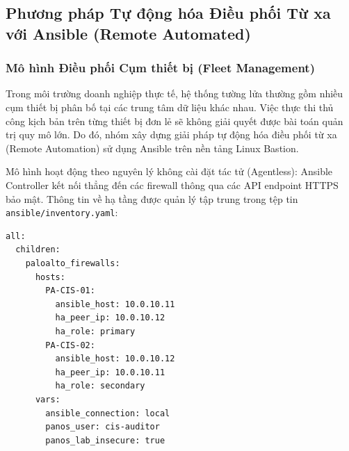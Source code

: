 \documentclass[12pt,a4paper]{article}
\begin{document}
\subsection{Phương pháp Tự động hóa Điều phối Từ xa với Ansible (Remote Automated)}

\subsubsection{Mô hình Điều phối Cụm thiết bị (Fleet Management)}
Trong môi trường doanh nghiệp thực tế, hệ thống tường lửa thường gồm nhiều cụm thiết bị phân bố tại các trung tâm dữ liệu khác nhau. Việc thực thi thủ công kịch bản trên từng thiết bị đơn lẻ sẽ không giải quyết được bài toán quản trị quy mô lớn. Do đó, nhóm xây dựng giải pháp tự động hóa điều phối từ xa (Remote Automation) sử dụng Ansible trên nền tảng Linux Bastion.

Mô hình hoạt động theo nguyên lý không cài đặt tác tử (Agentless): Ansible Controller kết nối thẳng đến các firewall thông qua các API endpoint HTTPS bảo mật. Thông tin về hạ tầng được quản lý tập trung trong tệp tin \texttt{ansible/inventory.yaml}:

\begin{lstlisting}[language={},caption={Cấu hình Ansible Inventory quản lý cụm tường lửa Palo Alto}]
all:
  children:
    paloalto_firewalls:
      hosts:
        PA-CIS-01:
          ansible_host: 10.0.10.11
          ha_peer_ip: 10.0.10.12
          ha_role: primary
        PA-CIS-02:
          ansible_host: 10.0.10.12
          ha_peer_ip: 10.0.10.11
          ha_role: secondary
      vars:
        ansible_connection: local
        panos_user: cis-auditor
        panos_lab_insecure: true
\end{lstlisting}
\end{document}
